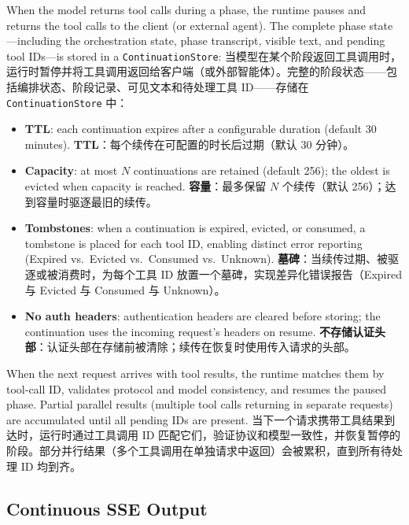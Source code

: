 When the model returns tool calls during a phase, the runtime pauses and returns the tool calls to the client (or external agent). The complete phase state---including the orchestration state, phase transcript, visible text, and pending tool IDs---is stored in a \texttt{ContinuationStore}:
当模型在某个阶段返回工具调用时，运行时暂停并将工具调用返回给客户端（或外部智能体）。完整的阶段状态——包括编排状态、阶段记录、可见文本和待处理工具 ID——存储在 \texttt{ContinuationStore} 中：

\begin{itemize}[nosep]
    \item \textbf{TTL}: each continuation expires after a configurable duration (default 30 minutes).
    \textbf{TTL}：每个续传在可配置的时长后过期（默认 30 分钟）。
    \item \textbf{Capacity}: at most $N$ continuations are retained (default 256); the oldest is evicted when capacity is reached.
    \textbf{容量}：最多保留 $N$ 个续传（默认 256）；达到容量时驱逐最旧的续传。
    \item \textbf{Tombstones}: when a continuation is expired, evicted, or consumed, a tombstone is placed for each tool ID, enabling distinct error reporting (Expired vs.\ Evicted vs.\ Consumed vs.\ Unknown).
    \textbf{墓碑}：当续传过期、被驱逐或被消费时，为每个工具 ID 放置一个墓碑，实现差异化错误报告（Expired 与 Evicted 与 Consumed 与 Unknown）。
    \item \textbf{No auth headers}: authentication headers are cleared before storing; the continuation uses the incoming request's headers on resume.
    \textbf{不存储认证头部}：认证头部在存储前被清除；续传在恢复时使用传入请求的头部。
\end{itemize}

When the next request arrives with tool results, the runtime matches them by tool-call ID, validates protocol and model consistency, and resumes the paused phase. Partial parallel results (multiple tool calls returning in separate requests) are accumulated until all pending IDs are present.
当下一个请求携带工具结果到达时，运行时通过工具调用 ID 匹配它们，验证协议和模型一致性，并恢复暂停的阶段。部分并行结果（多个工具调用在单独请求中返回）会被累积，直到所有待处理 ID 均到齐。

\subsection{Continuous SSE Output}
\label{sec:sse}

